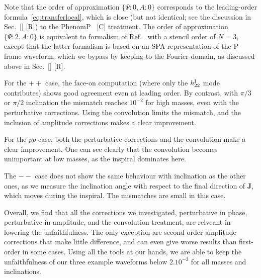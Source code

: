 \documentclass[aps,showpacs,twocolumn,
prd,superscriptaddress,nofootinbib]{revtex4-1}
\newcommand{\SM}[1]{{\color{Red} #1}}
\begin{document}
Note that the order of approximation $\{\Psi:0,A:0\}$ corresponds to the leading-order formula~\eqref{eq:transferlocal}, which is close (but not identical; see the discussion in Sec.~\ref{} \SM{[R]}) to the PhenomP~\cite{} \SM{[C]} treatment. The order of approximation $\{\Psi:2,A:0\}$ is equivalent to formalism of Ref.~\cite{KCY14} with a stencil order of $N=3$, except that the latter formalism is based on an SPA representation of the P-frame waveform, which we bypass by keeping to the Fourier-domain, as discussed above in Sec.~\ref{} \SM{[R]}.

For the $++$ case, the face-on computation (where only the $h^{\rm I}_{22}$ mode contributes) shows good agreement even at leading order. By contrast, with $\pi/3$ or $\pi/2$ inclination the mismatch reaches $10^{-2}$ for high masses, even with the perturbative corrections. Using the convolution limits the mismatch, and the inclusion of amplitude corrections makes a clear improvement.

For the $pp$ case, both the perturbative corrections and the convolution make a clear improvement. One can see clearly that the convolution becomes unimportant at low masses, as the inspiral dominates here.

The $--$ case does not show the same behaviour with inclination as the other ones, as we measure the inclination angle with respect to the final direction of $\bm{J}$, which moves during the inspiral. The mismatches are small in this case.

Overall, we find that all the corrections we investigated, perturbative in phase, perturbative in amplitude, and the convolution treatment, are relveant in lowering the unfaithfulness. The only exception are second-order amplitude corrections that make little difference, and can even give worse results than first-order in some cases. Using all the tools at our hands, we are able to keep the unfaithfulness of our three example waveforms below $2.10^{-3}$ for all masses and inclinations.
\end{document}
